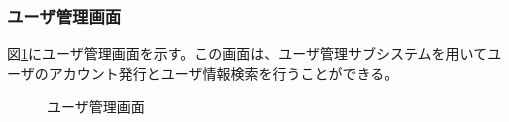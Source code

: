 \documentclass[a4j]{jarticle}
\begin{document}


\subsubsection{ユーザ管理画面}
図\ref{fig:user_admin_top}にユーザ管理画面を示す。この画面は、ユーザ管理サブシステムを用いてユーザのアカウント発行とユーザ情報検索を行うことができる。
\begin{figure}[H]
\centering
{}
\caption{ユーザ管理画面}
\label{fig:user_admin_top}
\end{figure}
\end{document}
